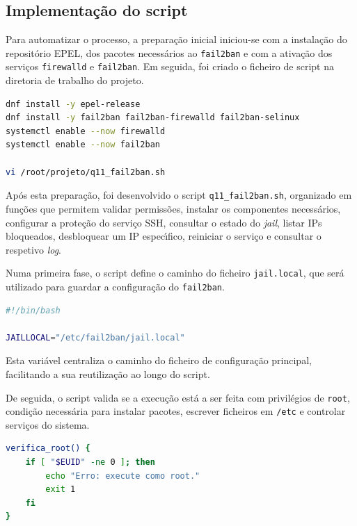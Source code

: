 \subsection{Implementa\c{c}\~ao do script}

Para automatizar o processo, a prepara\c{c}\~ao inicial iniciou-se com a instala\c{c}\~ao do reposit\'orio EPEL, dos pacotes necess\'arios ao \texttt{fail2ban} e com a ativa\c{c}\~ao dos servi\c{c}os \texttt{firewalld} e \texttt{fail2ban}. Em seguida, foi criado o ficheiro de script na diretoria de trabalho do projeto.

\begin{lstlisting}[language=bash,caption={Preparacao inicial da Questao 11}]
dnf install -y epel-release
dnf install -y fail2ban fail2ban-firewalld fail2ban-selinux
systemctl enable --now firewalld
systemctl enable --now fail2ban

vi /root/projeto/q11_fail2ban.sh
\end{lstlisting}

Ap\'os esta prepara\c{c}\~ao, foi desenvolvido o script \texttt{q11\_fail2ban.sh}, organizado em fun\c{c}\~oes que permitem validar permiss\~oes, instalar os componentes necess\'arios, configurar a prote\c{c}\~ao do servi\c{c}o SSH, consultar o estado do \textit{jail}, listar IPs bloqueados, desbloquear um IP espec\'{\i}fico, reiniciar o servi\c{c}o e consultar o respetivo \textit{log}.

Numa primeira fase, o script define o caminho do ficheiro \texttt{jail.local}, que ser\'a utilizado para guardar a configura\c{c}\~ao do \texttt{fail2ban}.

\begin{lstlisting}[language=bash,caption={Definicao inicial do ficheiro de configuracao}]
#!/bin/bash

JAILLOCAL="/etc/fail2ban/jail.local"
\end{lstlisting}

Esta vari\'avel centraliza o caminho do ficheiro de configura\c{c}\~ao principal, facilitando a sua reutiliza\c{c}\~ao ao longo do script.

De seguida, o script valida se a execu\c{c}\~ao est\'a a ser feita com privil\'egios de \texttt{root}, condi\c{c}\~ao necess\'aria para instalar pacotes, escrever ficheiros em \texttt{/etc} e controlar servi\c{c}os do sistema.

\begin{lstlisting}[language=bash,caption={Validacao de privilegios de execucao}]
verifica_root() {
    if [ "$EUID" -ne 0 ]; then
        echo "Erro: execute como root."
        exit 1
    fi
}
\end{lstlisting}

